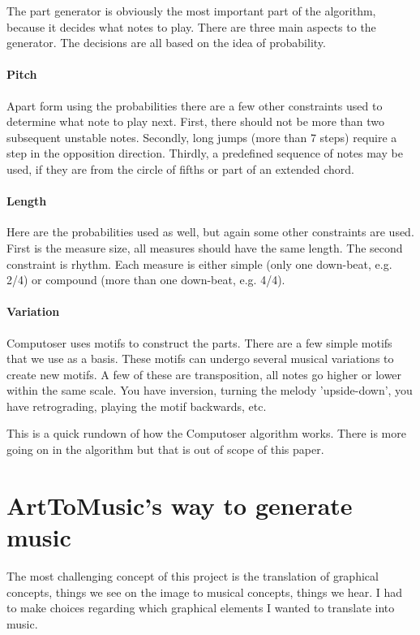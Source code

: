\documentclass[12pt]{article}
\begin{document}
The part generator is obviously the most important part of the algorithm, because it decides what notes to play. There are three main aspects to the generator. The decisions are all based on the idea of probability.

\paragraph{Pitch} Apart form using the probabilities there are a few other constraints used to determine what note to play next. First, there should not be more than two subsequent unstable notes. Secondly, long jumps (more than 7 steps) require a step in the opposition direction. Thirdly, a predefined sequence of notes may be used, if they are from the circle of fifths or part of an extended chord.

\paragraph{Length} Here are the probabilities used as well, but again some other constraints are used. First is the measure size, all measures should have the same length. The second constraint is rhythm. Each measure is either simple (only one down-beat, e.g. 2/4) or compound (more than one down-beat, e.g. 4/4).

\paragraph{Variation} Computoser uses motifs to construct the parts. There are a few simple motifs that we use as a basis. These motifs can undergo several musical variations to create new motifs. A few of these are transposition, all notes go higher or lower within the same scale. You have inversion, turning the melody 'upside-down', you have retrograding, playing the motif backwards, etc.
\newline

This is a quick rundown of how the Computoser algorithm works. There is more going on in the algorithm but that is out of scope of this paper.

\section{ArtToMusic's way to generate music}

The most challenging concept of this project is the translation of graphical concepts, things we see on the image to musical concepts, things we hear. I had to make choices regarding which graphical elements I wanted to translate into music.
\end{document}
